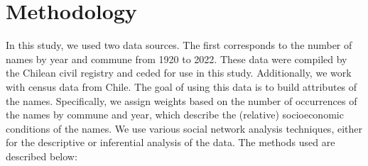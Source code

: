 \section{Methodology}

In this study, we used two data sources. The first corresponds to the number of names by year and commune from 1920 to 2022. These data were compiled by the Chilean civil registry and ceded for use in this study. Additionally, we work with census data from Chile. The goal of using this data is to build attributes of the names. Specifically, we assign weights based on the number of occurrences of the names by commune and year, which describe the (relative) socioeconomic conditions of the names. We use various social network analysis techniques, either for the descriptive or inferential analysis of the data. The methods used are described below:
\bigskip

